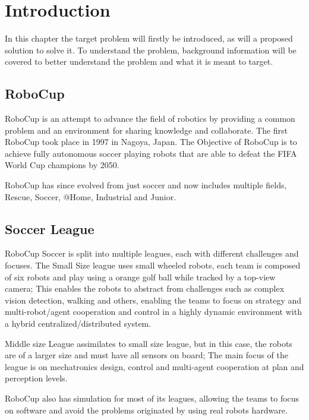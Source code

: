 \chapter{Introduction}
In this chapter the target problem will firstly be introduced, as will a proposed solution to solve it. To understand the problem, 
background information will be covered to better understand the problem and what it is meant to target.

    \section{RoboCup}
    RoboCup is an attempt to advance the field of robotics by providing a common problem and an environment for sharing knowledge and collaborate.
    The first RoboCup took place in 1997 in Nagoya, Japan. The Objective of RoboCup is to achieve fully autonomous soccer playing robots that are able to defeat the FIFA World Cup champions by 2050. 

    RoboCup has since evolved from just soccer and now includes multiple fields, Rescue, Soccer, @Home, Industrial and Junior.
    \cite{RoboCup}

    \section{Soccer League}
    RoboCup Soccer is split into multiple leagues, each with different challenges and focuses. The Small Size league uses small wheeled robots, 
    each team is composed of six robots and play using a orange golf ball while tracked by a top-view camera;
    This enables the robots to abstract from challenges such as complex vision detection, 
    walking and others, enabling the teams to focus on strategy and multi-robot/agent cooperation and 
    control in a highly dynamic environment with a hybrid centralized/distributed system. 

    Middle size League assimilates to small size league, but in this case, the robots are of a larger size and must have all sensors on board; 
    The main focus of the league is on mechatronics design, control and multi-agent cooperation at plan and perception levels.

    RoboCup also has simulation for most of its leagues, allowing the teams to focus on software and avoid the problems originated by using real robots hardware.

